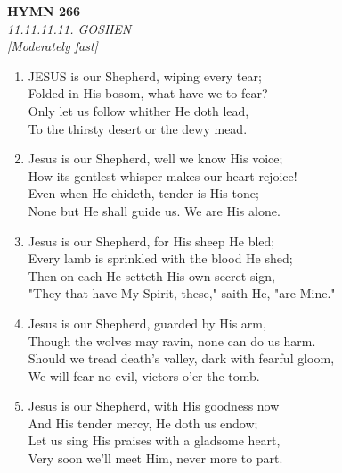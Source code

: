 \newpage
\begin{center}
    {\Large \textbf{HYMN 266}}
    \\
    \textit{11.11.11.11. GOSHEN}
    \\
    \textit{\small [Moderately fast]}
\end{center}
\vspace{1em}

\begin{enumerate}
    \item JESUS is our Shepherd, wiping every tear; \\
        Folded in His bosom, what have we to fear? \\
        Only let us follow whither He doth lead, \\
        To the thirsty desert or the dewy mead.

    \item Jesus is our Shepherd, well we know His voice; \\
        How its gentlest whisper makes our heart rejoice! \\
        Even when He chideth, tender is His tone; \\
        None but He shall guide us. We are His alone.

    \item Jesus is our Shepherd, for His sheep He bled; \\
        Every lamb is sprinkled with the blood He shed; \\
        Then on each He setteth His own secret sign, \\
        "They that have My Spirit, these," saith He, "are Mine."

    \item Jesus is our Shepherd, guarded by His arm, \\
        Though the wolves may ravin, none can do us harm. \\
        Should we tread death's valley, dark with fearful gloom, \\
        We will fear no evil, victors o'er the tomb.

    \item Jesus is our Shepherd, with His goodness now \\
        And His tender mercy, He doth us endow; \\
        Let us sing His praises with a gladsome heart, \\
        Very soon we'll meet Him, never more to part.

\end{enumerate}
